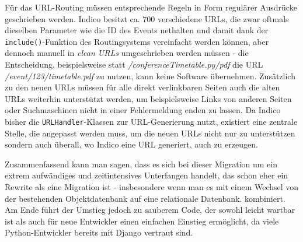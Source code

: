 Für das URL-Routing müssen entsprechende Regeln in Form regulärer Ausdrücke geschrieben werden.
Indico besitzt ca. 700 verschiedene URLs, die zwar oftmals dieselben Parameter wie die ID des Events
nethalten und damit dank der \lstinline{include()}-Funktion des Routingsystems vereinfacht werden
können, aber dennoch manuell in \emph{clean URLs} umgeschrieben werden müssen - die Entscheidung,
beispielsweise statt \emph{/conferenceTimetable.py/pdf} die URL \emph{/event/123/timetable.pdf} zu
nutzen, kann keine Software übernehmen. Zusätzlich zu den neuen URLs müssen für alle direkt
verlinkbaren Seiten auch die alten URLs weiterhin unterstützt werden, um beispielsweise Links von
anderen Seiten oder Suchmaschinen nicht in einer Fehlermeldung enden zu lassen. Da Indico bisher die
\lstinline{URLHandler}-Klassen zur URL-Generierung nutzt, existiert eine zentrale Stelle, die
angepasst werden muss, um die neuen URLs nicht nur zu unterstützen sondern auch überall, wo Indico
eine URL generiert, auch zu erzeugen.

Zusammenfassend kann man sagen, dass es sich bei dieser Migration um ein extrem aufwändiges und
zeitintensives Unterfangen handelt, das schon eher ein Rewrite als eine Migration ist - insbesondere
wenn man es mit einem Wechsel von der bestehenden Objektdatenbank auf eine relationale Datenbank.
kombiniert. Am Ende führt der Umstieg jedoch zu sauberem Code, der sowohl leicht wartbar ist als
auch für neue Entwickler einen einfachen Einstieg ermöglicht, da viele Python-Entwickler bereits mit
Django vertraut sind.


